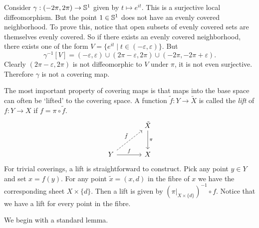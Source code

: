 \begin{example}
Consider $\gamma : (-2\pi, 2\pi) \to \mathbb{S}^1$ given by $t \mapsto e^{it}$.
This is a surjective local diffeomorphism.
But the point $1 \in \mathbb{S}^1$ does not have an evenly covered neighborhood.
To prove this, notice that open subsets of evenly covered sets are themselves evenly covered.
So if there exists an evenly covered neighborhood, there exists one of the form $V = \{ e^{it} \mid t \in (-\varepsilon,\varepsilon) \}$.
But 
\[
\gamma^{-1}[V] = (-\varepsilon,\varepsilon) \cup (2\pi - \varepsilon,2\pi) \cup (-2\pi,-2\pi+\varepsilon).
\]
Clearly $(2\pi - \varepsilon,2\pi)$ is not diffeomorphic to $V$ under $\pi$, it is not even surjective.
Therefore $\gamma$ is not a covering map.
\end{example}

The most important property of covering maps is that maps into the base space can often be `lifted' to the covering space.
A function $\tilde{f} : Y \to \tilde{X}$ is called the \emph{lift} of $f : Y \to X$ if $f = \pi \circ \tilde{f}$.
\[
\begin{tikzcd}[sep=large]
& \tilde{X} \arrow[d, "\pi"] \\
Y \arrow[r, "f"] \arrow[ru, dashed, "\tilde{f}"] & X
\end{tikzcd}
\]
For trivial coverings, a lift is straightforward to construct.
Pick any point $y \in Y$ and set $x = f(y)$.
For any point $\tilde{x} = (x,d)$ in the fibre of $x$ we have the corresponding sheet $X\times\{d\}$.
Then a lift is given by $(\pi|_{X\times\{d\}})^{-1} \circ f$.
Notice that we have a lift for every point in the fibre.

We begin with a standard lemma.

